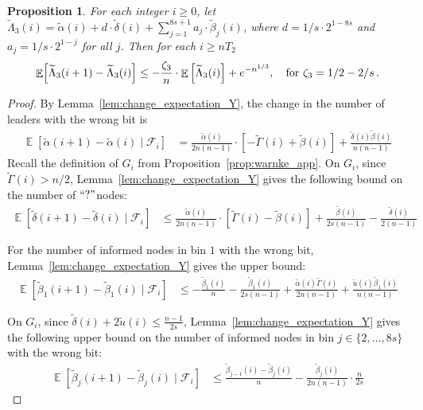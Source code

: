 \documentclass[a4paper,12pt]{article}
\newcommand{\q}{$``?"$}
\newtheorem{proposition}{Proposition}
\DeclareMathOperator{\Ex}{\mathbb{E}}%
\begin{document}
\begin{proposition} \label{prop:exp_lambda_3_tilde}
For each integer $i \geq 0$, let $\widetilde{\Lambda}_{3}(i) = \widetilde{\alpha}(i) + d \cdot \widetilde{\delta}(i) + \sum_{j=1}^{8s+1} a_j \cdot \widetilde{\beta}_j(i)$, where $d =1/s \cdot 2^{1-8s}$ and $a_j = 1/s \cdot 2^{1-j}$ for all $j$. Then for each $i \geq n T_2$
$$
\Ex\Bigl[\widetilde{\Lambda}_{3}(i+1) - \widetilde{\Lambda}_{3}(i) \Bigr] \leq - \frac{\zeta_{3}}{n} \cdot \Ex\left[\widetilde{\Lambda}_{3}(i)\right] + e^{-n^{1/3}}, \quad \mbox{for } \zeta_{3} = 1/2 - 2/s\,.
$$
\end{proposition}
\begin{proof}
By Lemma~\ref{lem:change_expectation_Y}, the change in the number of leaders with the wrong bit is
\begin{align} \label{eq:tilde_alpha_ub}
\Ex\left[ \widetilde{\alpha}(i+1) - \widetilde{\alpha}(i) \mid \mathcal{F}_i \right] & = \frac{\widetilde{\alpha}(i)}{2n(n-1)} \cdot \left[{-\widetilde{\Gamma}(i) + \widetilde{\beta}(i)}\right] + \frac{\widetilde{\delta}(i)\widetilde{\beta}(i)}{n(n-1)}
\end{align}
Recall the definition of $G_i$ from Proposition~\ref{prop:warnke_app}.
On $G_i$, since $\widetilde{\Gamma}(i) > n/2$,   Lemma~\ref{lem:change_expectation_Y} gives the following bound on the number of \q nodes:
\begin{align}  \label{eq:tilde_delta_ub}
\Ex\left[ \widetilde{\delta}(i+1) - \widetilde{\delta}(i) \mid \mathcal{F}_i \right] & \leq \frac{\widetilde{\alpha}(i)}{2n(n-1)} \cdot \left[{\widetilde{\Gamma}(i) - \widetilde{\beta}(i)}\right] + \frac{\widetilde{\beta}(i)}{2s(n-1)}  - \frac{\widetilde{\delta}(i)}{2(n-1)}
\end{align}

For the number of informed nodes in bin $1$ with the wrong bit, Lemma~\ref{lem:change_expectation_Y} gives the upper bound:
\begin{align} \label{eq:tilde_beta_1_ub}
\Ex\left[ \widetilde{\beta}_1(i+1) - \widetilde{\beta}_1(i) \mid \mathcal{F}_i \right] & \leq -\frac{\widetilde{\beta}_1(i)}{n} - \frac{\widetilde{\beta}_1(i)}{2s(n-1)}  + \frac{\widetilde{\alpha}(i)\widetilde{\Gamma}(i)}{2n(n-1)} + \frac{\widetilde{u}(i)\widetilde{\beta}_1(i)}{n(n-1)}
\end{align}

On $G_i$, since $\widetilde{\delta}(i) + 2 \widetilde{u}(i) \leq \frac{n-1}{2s}$, Lemma~\ref{lem:change_expectation_Y} gives the following upper bound on the number of informed nodes in bin $j \in\{2, \ldots, 8s\}$ with the wrong bit:
\begin{align} \label{eq:tilde_beta_j_ub}
\Ex\left[ \widetilde{\beta}_j(i+1) - \widetilde{\beta}_j(i) \mid \mathcal{F}_i \right] & \leq \frac{\widetilde{\beta}_{j-1}(i) - \widetilde{\beta}_{j}(i)}{n} -  \frac{\widetilde{\beta}_j(i)}{2n(n-1)} \cdot \frac{n}{2s}
\end{align}


\end{proof}
\end{document}

